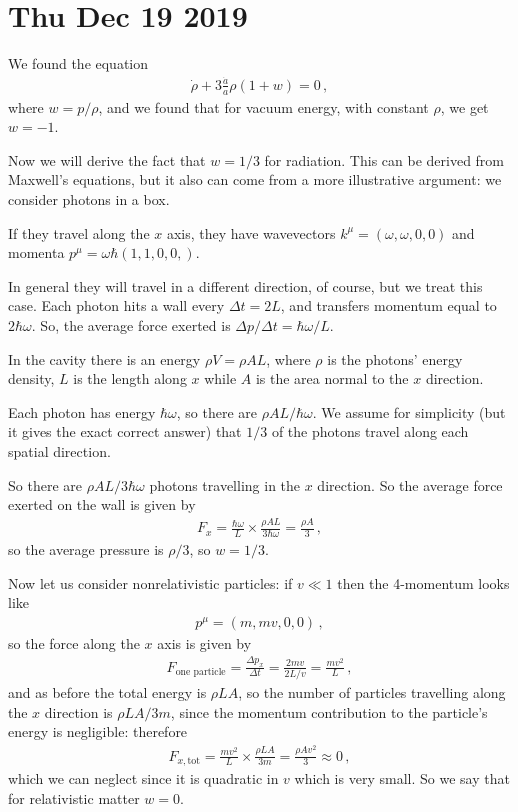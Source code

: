 \documentclass[main.tex]{subfiles}
\begin{document}
\section*{Thu Dec 19 2019}

We found the equation 
%
\begin{align}
\dot{\rho}  + 3 \frac{\dot{a}}{a} \rho (1 + w)=0
\,,
\end{align}
%
where \(w = p / \rho \), and we found that for
vacuum energy, with constant \(\rho \), we get \(w = -1\). 

Now we will derive the fact that \(w = 1/3\) for radiation.
This can be derived from Maxwell's equations, but it also can come from a more illustrative argument: we consider photons in a box. 

If they travel along the \(x\) axis, they have wavevectors \(k^{\mu } = (\omega ,  \omega , 0, 0)\) and momenta \(p^{\mu } = \omega \hbar (1, 1, 0, 0,)\).

In general they will travel in a different direction, of course, but we treat this case. 
Each photon hits a wall every \(\Delta t = 2L\), and transfers momentum equal to \(2 \hbar \omega \). So, the average force exerted is \(\Delta p / \Delta t = \hbar \omega /L\). 

In the cavity there is an energy \(\rho V = \rho AL\), where \(\rho \) is the photons' energy density, \(L\) is the length along \(x\) while \(A\) is the area normal to the \(x\) direction. 

Each photon has energy \(\hbar \omega \), so there are \(\rho A L / \hbar \omega \). We assume for simplicity (but it gives the exact correct answer) that \(1/3\) of the photons travel along each spatial direction. 

So there are \(\rho A L / 3 \hbar \omega \) photons travelling in the \(x\) direction. So the average force exerted on the wall is given by 
%
\begin{align}
F_{x} = \frac{\hbar \omega }{L} \times \frac{\rho A L}{3 \hbar \omega } = \frac{\rho A}{3}
\,,
\end{align}
%
so the average pressure is \(\rho /3\), so \(w = 1/3\). 

Now let us consider nonrelativistic particles: if \(v \ll 1\) then the 4-momentum looks like 
%
\begin{align}
p^{\mu } = (m, mv, 0, 0)
\,,
\end{align}
%
so the force along the \(x\) axis is given by 
%
\begin{align}
F_{\text{one particle}} = \frac{\Delta p_{x}}{\Delta t} = \frac{2mv}{2L / v} = \frac{mv^2}{L}
\,,
\end{align}
%
and as before the total energy is \(\rho L A\), so the number of particles travelling along the \(x\) direction is \(\rho L A /3 m\), since the momentum contribution to the particle's energy is negligible: therefore 
%
\begin{align}
F_{x, \text{tot}} = \frac{mv^2}{L} \times \frac{\rho LA}{3m} 
= \frac{\rho A v^2}{3} \approx 0
\,,
\end{align}
%
which we can neglect since it is quadratic in \(v\) which is very small. So we say that for relativistic matter \(w = 0\). 
\end{document}
